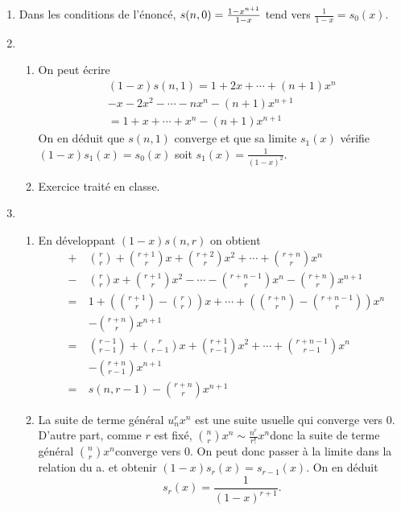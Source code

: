 \begin{enumerate}
\item  Dans les conditions de l'{\'e}nonc{\'e}, $s(n,0)=\frac{1-x^{n+1}}{%
1-x}$ tend vers $\frac{1}{1-x}=s_{0}(x)$.

\item \begin{enumerate} \item On peut {\'e}crire
\begin{eqnarray*}
(1-x)s(n,1)=1+2x+\cdots +(n+1)x^{n} \\
-x-2x^{2}-\cdots -nx^{n}-(n+1)x^{n+1} \\
=1+x+\cdots +x^{n}-(n+1)x^{n+1}
\end{eqnarray*}
On en d{\'e}duit que $s(n,1)$ converge et que sa limite $s_{1}(x)$
v{\'e}rifie $(1-x)s_{1}(x)=s_{0}(x)$ soit
$s_{1}(x)=\frac{1}{(1-x)^{2}}$.

\item  Exercice trait{\'e} en classe.
\end{enumerate}

\item \begin{enumerate} \item En d{\'e}veloppant $(1-x)s(n,r)$ on obtient
\begin{eqnarray*}
&+&\binom{r}{r}+\binom{r+1}{r}x+\binom{r+2}{r}x^{2}+\cdots
+\binom{r+n}{r}x^{n} \\
&-&\binom{r}{r}x+\binom{r+1}{r}x^{2}-\cdots
-\binom{r+n-1}{r}x^{n}-\binom{r+n}{r}x^{n+1} \\
&=&1+(\binom{r+1}{r}-\binom{r}{r})x+\cdots
+(\binom{r+n}{r}-\binom{r+n-1}{r})x^{n}\\
&\quad& -\binom{r+n}{r}x^{n+1} \\
&=&\binom{r-1}{r-1}+\binom{r}{r-1}x+\binom{r+1}{r-1}x^{2}+\cdots
+\binom{r+n-1}{r-1}x^{n}\\
&\quad&-\binom{r+n}{r-1}x^{n+1} \\
&=&s(n,r-1)-\binom{r+n}{r}x^{n+1}
\end{eqnarray*}

\item  La suite de terme g{\'e}n{\'e}ral $u_{n}^{r}x^{n}$ est une suite
usuelle qui converge vers 0. D'autre part, comme $r$ est fix{\'e}, $\binom{n%
}{r}x^{n}\sim \frac{n^{r}}{r!}x^{n}$donc la suite de terme g{\'e}n{\'e}ral $%
\binom{n}{r}x^{n}$converge vers 0. On peut donc passer {\`a} la limite
dans la relation du a. et obtenir $(1-x)s_{r}(x)=s_{r-1}(x)$. On
en d{\'e}duit
\[
s_{r}(x)=\frac{1}{(1-x)^{r+1}}\text{.}
\]
\end{enumerate}
\end{enumerate}
